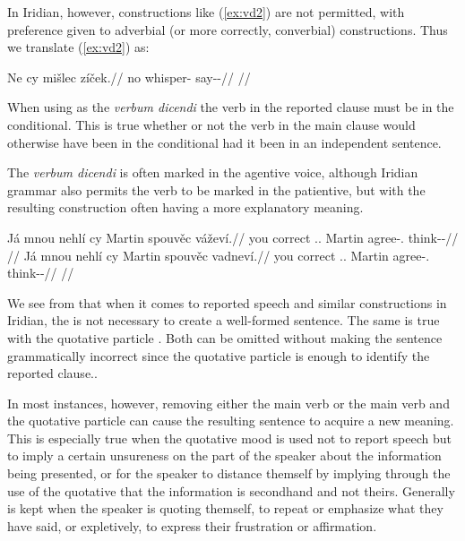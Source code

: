 In Iridian, however, constructions like (\ref{ex:vd2}) are not permitted, with
preference given to adverbial (or more correctly, converbial)
constructions. Thus we translate (\ref{ex:vd2}) as:

\pex
\begingl
\gla Ne cy mišlec zíček.//
\glb no  whisper-\Cv{} say-\Av{}-\Pf{}//
\glft {}//
\endgl
\xe

When using  as the \emph{verbum dicendi} the verb in the
reported clause must be in the conditional. This is true whether or not the verb
in the main clause would otherwise have been in the conditional had it been in
an independent sentence.

The \emph{verbum dicendi} is often marked in the agentive voice, although
Iridian grammar also permits the verb to be marked in the patientive, but with
the resulting construction often having a more explanatory meaning.

\pex
\a
\begingl
  \gla Já mnou nehlí cy Martin spouvěc váževí.//
  \glb you correct \Cop{}.\Sbj{}.\Quot{} \Quot{} Martin agree-\Cv{}.\Ipf{} think-\Av{}-\Cont{}//
  \glft {}//
\endgl
\a
\begingl
  \gla Já mnou nehlí cy Martin spouvěc vadneví.//
  \glb you correct \Cop{}.\Sbj{}.\Quot{} \Quot{} Martin agree-\Cv{}.\Ipf{} think-\Pv{}-\Cont{}//
  \glft {}//
\endgl
\xe

We see from  that when it comes to reported speech and similar constructions in
Iridian, the  is not necessary to
create a well-formed sentence. The same is true with the quotative particle
. Both can be omitted without making the sentence grammatically
incorrect since the quotative particle is enough to identify the reported
clause..

In most instances, however, removing either the main verb or the main verb and
the quotative particle can cause the resulting sentence to acquire a new
meaning. This is especially true when the quotative mood is used not to report
speech but to imply a certain unsureness on the part of the speaker about the
information being presented, or for the speaker to distance themself by implying
through the use of the quotative that the information is secondhand and not
theirs. Generally  is kept when the speaker is quoting themself, to
repeat or emphasize what they have said, or expletively, to express their
frustration or affirmation.

